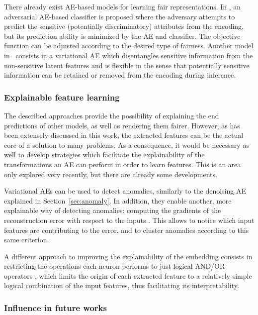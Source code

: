 There already exist AE-based models for learning fair representations. In , an adversarial AE-based classifier is proposed where the adversary attempts to predict the sensitive (potentially discriminatory) attributes from the encoding, but its prediction ability is minimized by the AE and classifier. The objective function can be adjusted according to the desired type of fairness. Another model in~ consists in a variational AE which disentangles sensitive information from the non-sensitive latent features and is flexible in the sense that potentially sensitive information can be retained or removed from the encoding during inference.

\subsubsection{Explainable feature learning}

The described approaches provide the possibility of explaining the end predictions of other models, as well as rendering them fairer. However, as has been extensely discussed in this work, the extracted features can be the actual core of a solution to many problems. As a consequence, it would be necessary as well to develop strategies which facilitate the explainability of the transformations an AE can perform in order to learn features. This is an area only explored very recently, but there are already some developments.

Variational AEs can be used to detect anomalies, similarly to the denoising AE explained in Section~\ref{sec:anomaly}. In addition, they enable another, more explainable way of detecting anomalies: computing the gradients of the reconstruction error with respect to the inputs . This allows to notice which input features are contributing to the error, and to cluster anomalies according to this same criterion.

A different approach to improving the explainability of the embedding consists in restricting the operations each neuron performs to just logical AND/OR operators , which limits the origin of each extracted feature to a relatively simple logical combination of the input features, thus facilitating its interpretability.

\subsubsection{Influence in future works}

